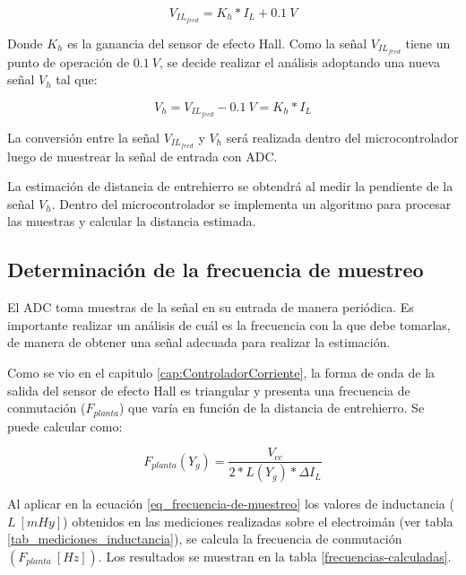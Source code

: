 \begin{equation*}
	V_{IL_{feed}}=K_h*I_L+0.1\:V
\end{equation*}

Donde $K_h$ es la ganancia del sensor de efecto Hall. Como la señal $V_{IL_{feed}}$ tiene un punto de operación de $0.1\:V$, se decide realizar el análisis adoptando una nueva señal $V_h$ tal que:

\begin{equation*}
	V_h=V_{IL_{feed}}-0.1\:V=K_h*I_L
\end{equation*}


La conversión entre la señal $V_{IL_{feed}}$ y $V_h$ será realizada dentro del microcontrolador luego de muestrear la señal de entrada con ADC.

La estimación de distancia de entrehierro se obtendrá al medir la pendiente de la señal $V_h$. Dentro del microcontrolador se implementa un algoritmo para procesar las muestras y calcular la distancia estimada. 

\subsection{Determinación de la frecuencia de muestreo}

El ADC toma muestras de la señal en su entrada de manera periódica. Es importante realizar un análisis de cuál es la frecuencia con la que debe tomarlas, de manera de obtener una señal adecuada para realizar la estimación.

Como se vio en el capitulo \ref{cap:ControladorCorriente}, la forma de onda de la salida del sensor de efecto Hall es triangular y presenta una frecuencia de conmutación ($F_{planta}$) que varía en función de la distancia de entrehierro. Se puede calcular como:

\begin{equation} \label{eq_frecuencia-de-muestreo}
	F_{planta}(Y_g)=\frac{V_{cc}}{2 * L(Y_g) * \Delta I_L}
\end{equation}


Al aplicar en la ecuación \ref{eq_frecuencia-de-muestreo} los valores de inductancia ($L\:[mHy]$) obtenidos en las mediciones realizadas sobre el electroimán (ver tabla \ref{tab_mediciones_inductancia}), se calcula la frecuencia de conmutación  $(F_{planta}\:[Hz])$. Los resultados se muestran en la tabla \ref{frecuencias-calculadas}.



